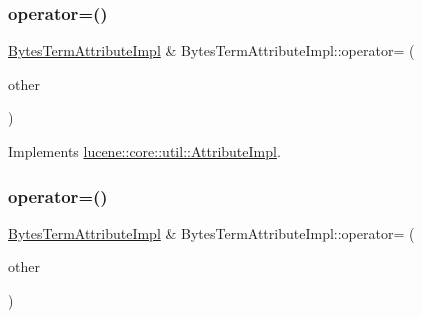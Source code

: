 \subsubsection{\texorpdfstring{operator=()}{operator=()}\hspace{0.1cm}{\footnotesize\ttfamily [1/2]}}
{\footnotesize\ttfamily \mbox{\hyperlink{classlucene_1_1core_1_1analysis_1_1tokenattributes_1_1BytesTermAttributeImpl}{Bytes\+Term\+Attribute\+Impl}} \& Bytes\+Term\+Attribute\+Impl\+::operator= (\begin{DoxyParamCaption}\item[{\mbox{\hyperlink{ZlibCrc32_8h_a2c212835823e3c54a8ab6d95c652660e}{const}} \mbox{\hyperlink{classlucene_1_1core_1_1util_1_1AttributeImpl}{lucene\+::core\+::util\+::\+Attribute\+Impl}} \&}]{other }\end{DoxyParamCaption})\hspace{0.3cm}{\ttfamily [virtual]}}



Implements \mbox{\hyperlink{classlucene_1_1core_1_1util_1_1AttributeImpl_ab032e399d03ce2f58c76881cf2b92325}{lucene\+::core\+::util\+::\+Attribute\+Impl}}.

\mbox{\label{classlucene_1_1core_1_1analysis_1_1tokenattributes_1_1BytesTermAttributeImpl_a3d91c14505c1b59ea0372697b87c79f6}} 
\subsubsection{\texorpdfstring{operator=()}{operator=()}\hspace{0.1cm}{\footnotesize\ttfamily [2/2]}}
{\footnotesize\ttfamily \mbox{\hyperlink{classlucene_1_1core_1_1analysis_1_1tokenattributes_1_1BytesTermAttributeImpl}{Bytes\+Term\+Attribute\+Impl}} \& Bytes\+Term\+Attribute\+Impl\+::operator= (\begin{DoxyParamCaption}\item[{\mbox{\hyperlink{ZlibCrc32_8h_a2c212835823e3c54a8ab6d95c652660e}{const}} \mbox{\hyperlink{classlucene_1_1core_1_1analysis_1_1tokenattributes_1_1BytesTermAttributeImpl}{Bytes\+Term\+Attribute\+Impl}} \&}]{other }\end{DoxyParamCaption})}

